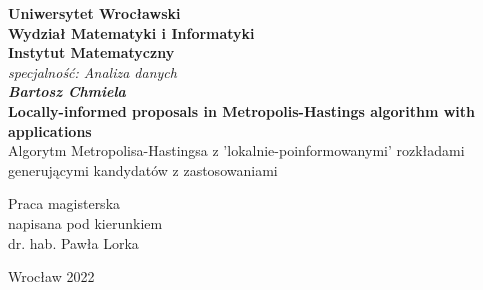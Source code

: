 \thispagestyle{empty}
\begin{center}
	\textbf{\large Uniwersytet Wroc\l{}awski\\
		Wydzia\l{} Matematyki i Informatyki\\
		Instytut Matematyczny}\\
	\textit{\large specjalno\'{s}\'{c}: Analiza danych}\\
	\vspace{4cm}
	\textbf{\textit{\large Bartosz Chmiela}\\
		\vspace{0.5cm}
		{\Large Locally-informed proposals in Metropolis-Hastings algorithm with applications}}\\
		\vspace{0.5cm}
		Algorytm Metropolisa-Hastingsa z 'lokalnie-poinformowanymi' rozkładami generującymi kandydatów z zastosowaniami
\end{center}
\vspace{3cm}
{\large \hspace*{6.5cm}Praca magisterska\\
	\hspace*{6.5cm}napisana pod kierunkiem\\
	\hspace*{6.5cm}dr. hab. Paw\l{}a Lorka }\\
\vfill
\begin{center}
	{\large Wroc\l{}aw 2022}\\
\end{center}